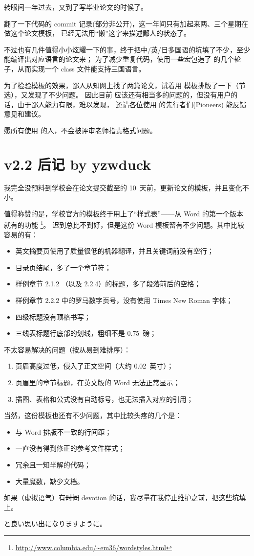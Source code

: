 转眼间一年过去，又到了写毕业论文的时候了。

翻了一下代码的 commit 记录(部分非公开)，这一年间只有加起来两、三个星期在做这个论文模板，
已经无法用“懒”这字来描述鄙人的状态了。

不过也有几件值得小小炫耀一下的事，终于把中/英/日多国语的坑填了不少，至少能编译出对应语言的论文来；
为了减少重复代码，使用一些宏包造了 \CTeX{} 的几个轮子，从而实现一个 class 文件能支持三国语言。

为了检验模板的效果，鄙人从知网上找了两篇论文，试着用 \nuaathesis{} 模板排版了一下（节选），又发现了不少问题。
因此目前 \nuaathesis{} 应该还有相当多的问题的，但没有用户的话，由于鄙人能力有限，难以发现，
还请各位使用 \nuaathesis{} 的先行者们(Pioneers) 能反馈意见和建议。

愿所有使用 \nuaathesis{} 的人，不会被评审老师指责格式问题。

\section{v2.2 后记 by yzwduck}

我完全没预料到学校会在论文提交截至的 10~天前，更新论文的模板，并且变化不小。

值得称赞的是，学校官方的模板终于用上了“样式表”——从 Word 的第一个版本就有的功能
\footnote{\url{http://www.columbia.edu/~em36/wordstyles.html}}。
迟到总比不到好，但是这份 Word 模板留有不少问题。其中比较容易的有：
\begin{itemize}
\item 英文摘要页使用了质量很低的机器翻译，并且关键词前没有空行；
\item 目录页结尾，多了一个章节符；
\item 样例章节 2.1.2 （以及 2.2.4）的标题，多了段落前后的空格；
\item 样例章节 2.2.2 中的罗马数字页号，没有使用 Times New Roman 字体；
\item 四级标题没有顶格书写；
\item 三线表标题行底部的划线，粗细不是 0.75~磅；
\end{itemize}

不太容易解决的问题（按从易到难排序）：
\begin{enumerate}
\item 页眉高度过低，侵入了正文空间（大约 0.02~英寸）；
\item 页眉里的章节标题，在英文版的 Word 无法正常显示；
\item 插图、表格和公式没有自动标号，也无法插入对应的引用；
\end{enumerate}

当然，这份模板也还有不少问题，其中比较头疼的几个是：
\begin{itemize}
\item 与 Word 排版不一致的行间距；
\item 一直没有得到修正的参考文件样式；
\item 冗余且一知半解的代码；
\item 大量魔数，缺少文档。
\end{itemize}

如果（虚拟语气）有\sout{时间} devotion 的话，我尽量在我停止维护之前，把这些坑填上。

\nuaathesis{} と良い思い出になりますように。
